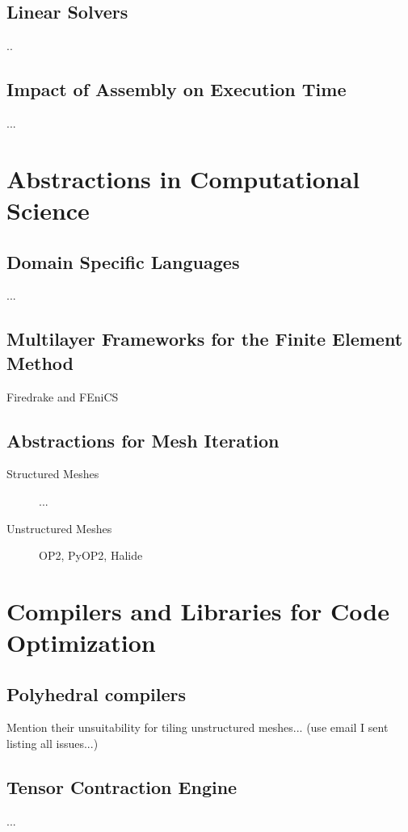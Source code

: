 \subsection{Linear Solvers}
\label{sec:bkg:linearsolvers}
..

\subsection{Impact of Assembly on Execution Time}
\label{sec:bkg:impact}
...


\section{Abstractions in Computational Science}
\label{sec:bkg:abstractions}

\subsection{Domain Specific Languages}
...

\subsection{Multilayer Frameworks for the Finite Element Method}
Firedrake and FEniCS

\subsection{Abstractions for Mesh Iteration}
\begin{description}
\item[Structured Meshes] ...
\item[Unstructured Meshes] OP2, PyOP2, Halide
\end{description}

\section{Compilers and Libraries for Code Optimization}
\label{sec:bkg:codeopt}

\subsection{Polyhedral compilers}
Mention their unsuitability for tiling unstructured meshes... (use email I sent listing all issues...)

\subsection{Tensor Contraction Engine}
...

